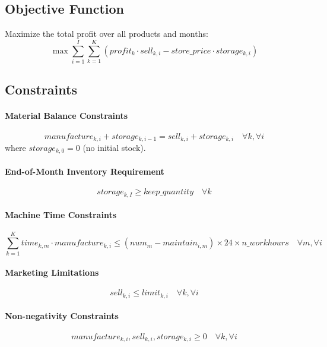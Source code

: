 \documentclass{article}
\begin{document}
\subsection*{Objective Function}
Maximize the total profit over all products and months:
\begin{equation}
\max \sum_{i=1}^{I} \sum_{k=1}^{K} \left( profit_{k} \cdot sell_{k,i} - store\_price \cdot storage_{k,i} \right)
\end{equation}

\subsection*{Constraints}

\paragraph{Material Balance Constraints}
\begin{equation}
manufacture_{k,i} + storage_{k,i-1} = sell_{k,i} + storage_{k,i} \quad \forall k, \forall i
\end{equation}
where $storage_{k,0} = 0$ (no initial stock).

\paragraph{End-of-Month Inventory Requirement}
\begin{equation}
storage_{k,I} \geq keep\_quantity \quad \forall k
\end{equation}

\paragraph{Machine Time Constraints}
\begin{equation}
\sum_{k=1}^{K} time_{k,m} \cdot manufacture_{k,i} \leq \left( num_{m} - maintain_{i,m} \right) \times 24 \times n\_workhours \quad \forall m, \forall i
\end{equation}

\paragraph{Marketing Limitations}
\begin{equation}
sell_{k,i} \leq limit_{k,i} \quad \forall k, \forall i
\end{equation}

\paragraph{Non-negativity Constraints}
\begin{equation}
manufacture_{k,i}, sell_{k,i}, storage_{k,i} \geq 0 \quad \forall k, \forall i
\end{equation}
\end{document}
